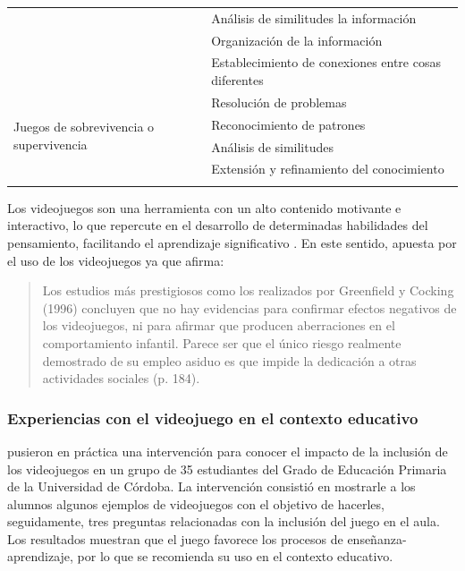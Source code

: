 \documentclass{textolivre}
\begin{document}
\begin{table}[htbp]
\begin{tabular}{p{}p{}}
 & Análisis de similitudes la información\\ 
 & Organización de la información\\ 
 & Establecimiento de conexiones entre cosas diferentes \\ 
\midrule
\multirow{4}{=}{Juegos de sobrevivencia o supervivencia} & Resolución de problemas\\ 
 & Reconocimiento de patrones\\ 
 & Análisis de similitudes\\ 
 & Extensión y refinamiento del conocimiento \\ 
\arrayrulecolor{black}
\bottomrule
\end{tabular}
\end{table}

Los videojuegos son una herramienta con un alto contenido motivante e interactivo, lo que repercute en el desarrollo de determinadas habilidades del pensamiento, facilitando el aprendizaje significativo \cite{riveraarteaga2018}. %
En este sentido, \textcite{sedeno2010} %
apuesta por el uso de los videojuegos ya que afirma:

\begin{quote}
Los estudios más prestigiosos como los realizados por Greenfield y Cocking (1996) concluyen que no hay evidencias para confirmar efectos negativos de los videojuegos, ni para afirmar que producen aberraciones en el comportamiento infantil. Parece ser que el único riesgo realmente demostrado de su empleo asiduo es que impide la dedicación a otras actividades sociales (p. 184).
\end{quote}

\subsubsection{Experiencias con el videojuego en el contexto educativo}
\textcite{moralesdiaz2018} %
pusieron en práctica una intervención para conocer el impacto de la inclusión de los videojuegos en un grupo de 35 estudiantes del Grado de Educación Primaria de la Universidad de Córdoba.  La intervención consistió en mostrarle a los alumnos algunos ejemplos de videojuegos con el objetivo de hacerles, seguidamente, tres preguntas relacionadas con la inclusión del juego en el aula.  Los resultados muestran que el juego favorece los procesos de enseñanza-aprendizaje, por lo que se recomienda su uso en el contexto educativo.
\end{document}
